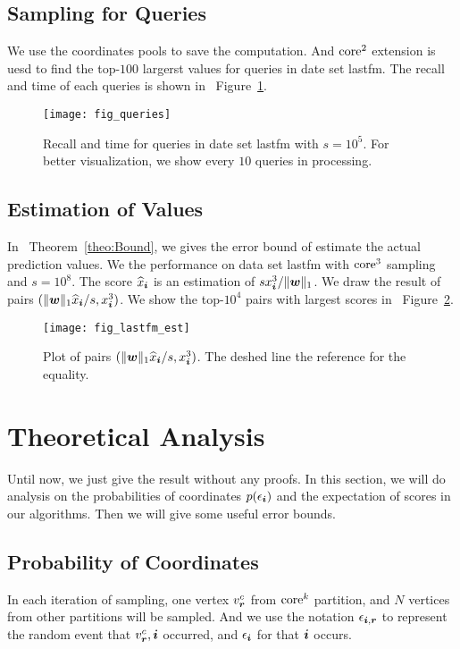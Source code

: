 \documentclass[letterpaper]{article}
\newcommand{\V}[1]{{\bm{{\MakeLowercase{#1}}}}}
\newcommand{\norm}[2]{\|#1\|_{#2}}
\newcommand{\Fig}[1]   {Figure~\ref{fig:#1}}
\newcommand{\Theo}[1] {Theorem~\ref{theo:#1}}
\begin{document}
\subsection{Sampling for Queries}
We use the coordinates pools to save the computation.
And ${\rm core}^2$ extension is uesd 
to find the top-$100$ largerst values for queries in date set lastfm.
The recall and time of each queries is shown in ~\Fig{Queries}.
\begin{figure}[t]
  \centering
  \texttt{[image: fig\_queries]}\\
  \caption{Recall and time for queries in date set lastfm with $s=10^5$.
           For better visualization,
           we show every $10$ queries in processing.}
  \label{fig:Queries}
\end{figure}
\subsection{Estimation of Values}
In ~\Theo{Bound}, we gives the error bound of estimate the actual prediction values.
We the performance on data set lastfm with ${\rm core}^3$ sampling and $s=10^8$.
The score $\widehat{x}_{\V{i}}$ is an estimation of $sx^3_{\V{i}}/\norm{\V{w}}{1}$.
We draw the result of pairs $(\norm{\V{w}}{1}\widehat{x}_{\V{i}}/s,x^3_{\V{i}})$.
We show the top-$10^4$ pairs with largest scores in ~\Fig{Est}.
\begin{figure}[t]
  \centering
  \texttt{[image: fig\_lastfm\_est]}\\
  \caption{Plot of pairs $(\norm{\V{w}}{1}\widehat{x}_{\V{i}}/s,x^3_{\V{i}})$.
          The deshed line the reference for the equality.}
  \label{fig:Est}
\end{figure}
\section{Theoretical Analysis}

Until now, we just give the result without any proofs.
In this section,
we will do analysis on the probabilities of coordinates $p(\epsilon_{\V{i}})$
and the expectation of scores in our algorithms.
Then we will give some useful error bounds.

\subsection{Probability of Coordinates}
In each iteration of sampling, one vertex $v^c_{\V{r}}$ from ${\rm core}^k$ partition,
and $N$ vertices from other partitions will be sampled.
And we use the notation $\epsilon_{\V{i},\V{r}}$ to represent the random event
that $v^c_{\V{r}},\V{i}$ occurred,
and $\epsilon_{\V{i}}$ for that $\V{i}$ occurs.
\end{document}
